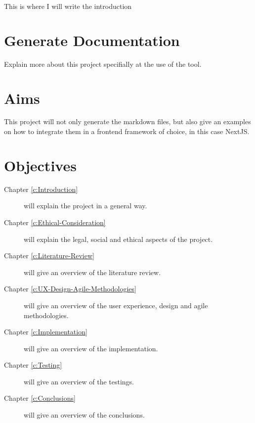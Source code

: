 This is where I will write the introduction

\section{Generate Documentation}
\label{s:Generate-Documentation}

Explain more about this project specifially at the use of the tool.

\section{Aims}
\label{s:Aim}

This project will not only generate the markdown files, but also give an examples on how to integrate them in a frontend framework of choice, in this case NextJS.

\section{Objectives}
\label{s:Objectives}

\begin{description}

  \item[Chapter \ref{c:Introduction}] will explain the project in a general way.

  \item[Chapter \ref{c:Ethical-Consideration}] will explain the legal, social and ethical aspects of the project.

  \item[Chapter \ref{c:Literature-Review}] will give an overview of the literature review.

  \item[Chapter \ref{c:UX-Design-Agile-Methodologies}] will give an overview of the user experience, design and agile methodologies.

  \item[Chapter \ref{c:Implementation}] will give an overview of the implementation.

  \item[Chapter \ref{c:Testing}] will give an overview of the testings.

  \item[Chapter \ref{c:Conclusions}] will give an overview of the conclusions.

\end{description}



